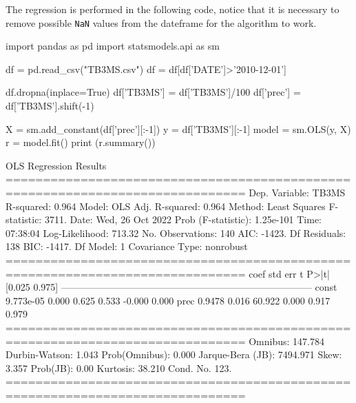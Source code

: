 The regression is performed in the following code, notice that it is necessary to remove possible \texttt{NaN} values from the dateframe for the algorithm to work. 

\begin{ipython}
import pandas as pd
import statsmodels.api as sm

df = pd.read_csv("TB3MS.csv")
df = df[df['DATE']>'2010-12-01']

df.dropna(inplace=True)
df['TB3MS'] = df['TB3MS']/100
df['prec'] = df['TB3MS'].shift(-1)

X = sm.add_constant(df['prec'][:-1])
y = df['TB3MS'][:-1]
model = sm.OLS(y, X)
r = model.fit()
print (r.summary())
\end{ipython}
\begin{ioutput}
                            OLS Regression Results                            
==============================================================================
Dep. Variable:                  TB3MS   R-squared:                       0.964
Model:                            OLS   Adj. R-squared:                  0.964
Method:                 Least Squares   F-statistic:                     3711.
Date:                Wed, 26 Oct 2022   Prob (F-statistic):          1.25e-101
Time:                        07:38:04   Log-Likelihood:                 713.32
No. Observations:                 140   AIC:                            -1423.
Df Residuals:                     138   BIC:                            -1417.
Df Model:                           1                                         
Covariance Type:            nonrobust                                         
==============================================================================
                 coef    std err          t      P>|t|      [0.025      0.975]
------------------------------------------------------------------------------
const       9.773e-05      0.000      0.625      0.533      -0.000       0.000
prec           0.9478      0.016     60.922      0.000       0.917       0.979
==============================================================================
Omnibus:                      147.784   Durbin-Watson:                   1.043
Prob(Omnibus):                  0.000   Jarque-Bera (JB):             7494.971
Skew:                           3.357   Prob(JB):                         0.00
Kurtosis:                      38.210   Cond. No.                         123.
==============================================================================
\end{ioutput}
